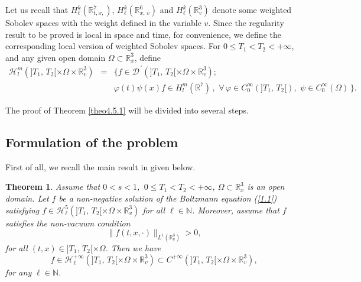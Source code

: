 \documentclass{amsart}[12pt, article]
\newtheorem{theo}{Theorem}[section]
\begin{document}
Let us recall that $ H^k_\ell  ({{{\mathbb R}}}^7_{t, x,}) $, $H^k_\ell({{{\mathbb R}}}^6_{x,\,
v})$ and $H^k_\ell({{{\mathbb R}}}^3_{v})$ denote some weighted Sobolev spaces
 with the weight defined in  the variable $v$. Since the regularity result to be proved is local in space and time,  for convenience, we define the corresponding
 local version of weighted Sobolev spaces. For
$0\leq T_1<T_2<+\infty$, and any given open domain
$\Omega\subset{{{\mathbb R}}}^3_x$, define
\begin{eqnarray*}
{\mathcal H}^m_l  (]T_1, \, T_2[\times\Omega\times{{{\mathbb R}}}^3_v)&=&
\Big\{f\in {{\mathcal D}}^{\, '}(]T_1, \, T_2[\times\Omega\times{{{\mathbb R}}}^3_v);\,\, \\
&&\varphi(t)\psi(x) f\in H^m_l({{{\mathbb R}}}^7)\,,\,\,\forall\,\varphi\in
C^\infty_0(]T_1, \, T_2[),\,\,\psi\in C^\infty_0(\Omega)\, \Big\}.
\end{eqnarray*}

The proof of Theorem \ref{theo4.5.1} will be divided into several steps.

\subsection{Formulation of the problem}\label{section6.1}
\setcounter{equation}{0}

First of all, we recall  the main result  in \cite{amuxy-nonlinear-3}  given below.

\begin{theo}\label{theo0.1}
Assume that $0<s<1$,\, $0\leq T_1<T_2<+\infty$,
$\Omega\subset{{{\mathbb R}}}^3_x$ is an open domain. Let $f$ be a non-negative
solution of the Boltzmann equation (\ref{1.1}) satisfying $f\in
{\mathcal H}^5_\ell  (]T_1, \, T_2[\times\Omega\times{{{\mathbb R}}}^3_v)$ for
all $\ell \in{{\mathbb N}}$. Moreover, assume that $f$ satisfies the non-vacuum
condition
\begin{equation}\label{0.1.4}
\|f(t, x, \cdot)\|_{L^1({{{\mathbb R}}}^3_v)}>0,
\end{equation}
for all $(t, x)\in ]T_1, \, T_2[\times\Omega$. Then we have
$$
f\in {\mathcal H}^{+\infty}_\ell(]T_1, \,
T_2[\times\Omega\times{{{\mathbb R}}}^3_v)\subset C^{+\infty}(]T_1, \,
T_2[\times\Omega\times{{{\mathbb R}}}^3_v),
$$
for any $\ell\in{{\mathbb N}}$.
\end{theo}
\end{document}
